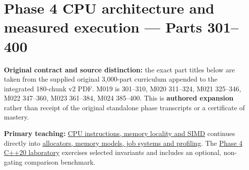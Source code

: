 \section{Phase 4 CPU architecture and measured execution --- Parts 301--400}\label{appendix-fd090d982a15-phase-4-cpu-architecture-and-measured-execution-parts-301400}

\textbf{Original contract and source distinction:} the exact part titles below are taken from the supplied original 3,000-part curriculum appended to the integrated 180-chunk v2 PDF. M019 is 301--310, M020 311--324, M021 325--346, M022 347--360, M023 361--384, M024 385--400. This is \textbf{authored expansion} rather than receipt of the original standalone phase transcripts or a certificate of mastery.

\textbf{Primary teaching:} \href{Continuous\%20Notes/Computing\%20Foundations\%20-\%20From\%20Bits\%20to\%20C++\%20and\%20Systems\%20APIs\#From\%20a\%20correct\%20C++\%20asset\%20service\%20to\%20the\%20instructions\%20a\%20CPU\%20can\%20execute\%20—\%20Phase\%204,\%20M019–M021,\%20Parts\%20301–346}{CPU instructions, memory locality and SIMD} continues directly into \href{Continuous\%20Notes/Computing\%20Foundations\%20-\%20From\%20Bits\%20to\%20C++\%20and\%20Systems\%20APIs\#From\%20temporary\%20memory\%20to\%20finished\%20parallel\%20frames\%20—\%20Phase\%204,\%20M022–M024,\%20Parts\%20347–400}{allocators, memory models, job systems and profiling}. The \href{tools/labs/phase4_cpu_systems_lab.cpp}{Phase 4 C++20 laboratory} exercises selected invariants and includes an optional, non-gating comparison benchmark.

